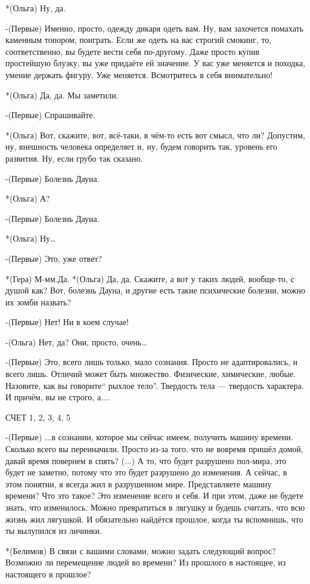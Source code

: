 *(Ольга) Ну, да. 

-(Первые) Именно, просто, одежду дикаря одеть вам. Ну, вам захочется помахать каменным топором, поиграть. Если же одеть на вас строгий смокинг, то, соответственно, вы будете вести себя по-другому. Даже просто купив простейшую блузку, вы уже придаёте ей значение. У вас уже меняется и походка, умение держать фигуру. Уже меняется. Всмотритесь в себя внимательно!

*(Ольга) Да, да. Мы заметили. 

-(Первые) Спрашивайте.

*(Ольга) Вот, скажите, вот, всё-таки, в чём-то есть вот смысл, что ли? Допустим, ну, внешность человека определяет и, ну, будем говорить так, уровень его развития. Ну, если грубо так сказано.

-(Первые) Болезнь Дауна.

*(Ольга) А?

-(Первые) Болезнь Дауна.

*(Ольга) Ну…

-(Первые) Это, уже ответ?

*(Гера) М-мм.Да.
*(Ольга) Да, да. Скажите, а вот у таких людей, вообще-то, с душой как? Вот, болезнь Дауна, и другие есть такие психические болезни, можно их зомби назвать?

-(Первые) Нет! Ни в коем случае!

-(Ольга) Нет, да? Они, просто, очень…

-(Первые) Это, всего лишь только, мало сознания. Просто не адаптировались, и всего лишь. Отличий может быть множество. Физические, химические, любые. Назовите, как вы говорите“ рыхлое тело”. Твердость тела — твердость характера. И причём, вы не строго, а....

СЧЕТ 1, 2, 3, 4, 5

-(Первые) ...в сознании, которое мы сейчас имеем, получить машину времени. Сколько всего вы переиначили. Просто из-за того, что не вовремя пришёл домой, давай время повернем в спять? (...) А то, что будет разрушено пол-мира, это будет не заметно, потому что это будет разрушено до изменения. А сейчас, в этом понятии, я всегда жил в разрушенном мире. Представляете машину времени? Что это такое? Это изменение всего и себя. И при этом, даже не будете знать, что изменилось. Можно превратиться в лягушку и будешь считать, что всю жизнь жил лягушкой. И обязательно найдётся прошлое, когда ты вспомнишь, что ты вылупился из личинки.

*(Белимов) В связи с вашими словами, можно задать следующий вопрос? Возможно ли перемещение людей во времени? Из прошлого в настоящее, из настоящего в прошлое?

